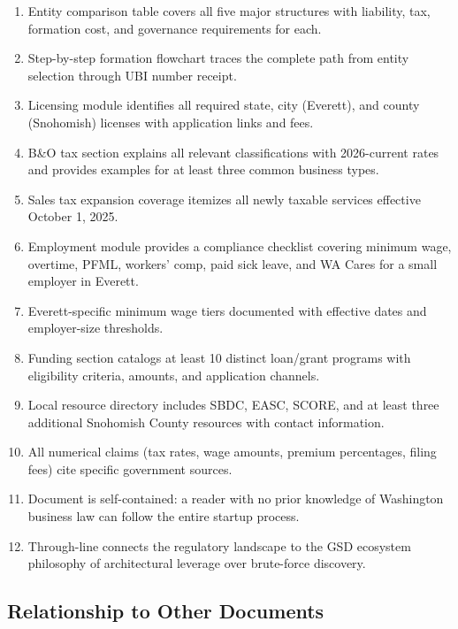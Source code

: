 \documentclass[11pt,letterpaper]{article}
\begin{document}
\begin{enumerate}[leftmargin=2.5em]
  \item Entity comparison table covers all five major structures with liability, tax, formation cost, and governance requirements for each.
  \item Step-by-step formation flowchart traces the complete path from entity selection through UBI number receipt.
  \item Licensing module identifies all required state, city (Everett), and county (Snohomish) licenses with application links and fees.
  \item B\&O tax section explains all relevant classifications with 2026-current rates and provides examples for at least three common business types.
  \item Sales tax expansion coverage itemizes all newly taxable services effective October 1, 2025.
  \item Employment module provides a compliance checklist covering minimum wage, overtime, PFML, workers' comp, paid sick leave, and WA Cares for a small employer in Everett.
  \item Everett-specific minimum wage tiers documented with effective dates and employer-size thresholds.
  \item Funding section catalogs at least 10 distinct loan/grant programs with eligibility criteria, amounts, and application channels.
  \item Local resource directory includes SBDC, EASC, SCORE, and at least three additional Snohomish County resources with contact information.
  \item All numerical claims (tax rates, wage amounts, premium percentages, filing fees) cite specific government sources.
  \item Document is self-contained: a reader with no prior knowledge of Washington business law can follow the entire startup process.
  \item Through-line connects the regulatory landscape to the GSD ecosystem philosophy of architectural leverage over brute-force discovery.
\end{enumerate}

\subsection{Relationship to Other Documents}
\end{document}
